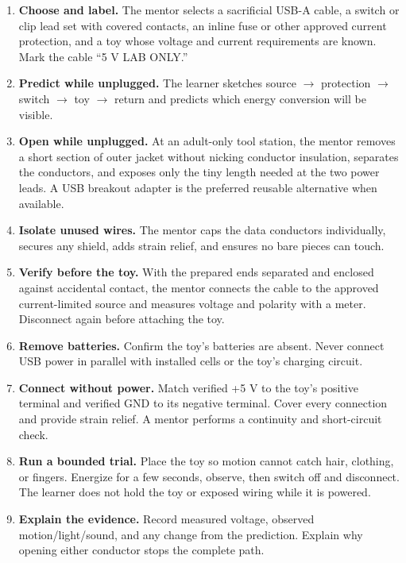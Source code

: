 \begin{enumerate}
  \item \textbf{Choose and label.} The mentor selects a sacrificial USB-A cable, a switch or clip lead set with covered contacts, an inline fuse or other approved current protection, and a toy whose voltage and current requirements are known. Mark the cable ``5 V LAB ONLY.''
  \item \textbf{Predict while unplugged.} The learner sketches source $\rightarrow$ protection $\rightarrow$ switch $\rightarrow$ toy $\rightarrow$ return and predicts which energy conversion will be visible.
  \item \textbf{Open while unplugged.} At an adult-only tool station, the mentor removes a short section of outer jacket without nicking conductor insulation, separates the conductors, and exposes only the tiny length needed at the two power leads. A USB breakout adapter is the preferred reusable alternative when available.
  \item \textbf{Isolate unused wires.} The mentor caps the data conductors individually, secures any shield, adds strain relief, and ensures no bare pieces can touch.
  \item \textbf{Verify before the toy.} With the prepared ends separated and enclosed against accidental contact, the mentor connects the cable to the approved current-limited source and measures voltage and polarity with a meter. Disconnect again before attaching the toy.
  \item \textbf{Remove batteries.} Confirm the toy's batteries are absent. Never connect USB power in parallel with installed cells or the toy's charging circuit.
  \item \textbf{Connect without power.} Match verified +5 V to the toy's positive terminal and verified GND to its negative terminal. Cover every connection and provide strain relief. A mentor performs a continuity and short-circuit check.
  \item \textbf{Run a bounded trial.} Place the toy so motion cannot catch hair, clothing, or fingers. Energize for a few seconds, observe, then switch off and disconnect. The learner does not hold the toy or exposed wiring while it is powered.
  \item \textbf{Explain the evidence.} Record measured voltage, observed motion/light/sound, and any change from the prediction. Explain why opening either conductor stops the complete path.
\end{enumerate}

